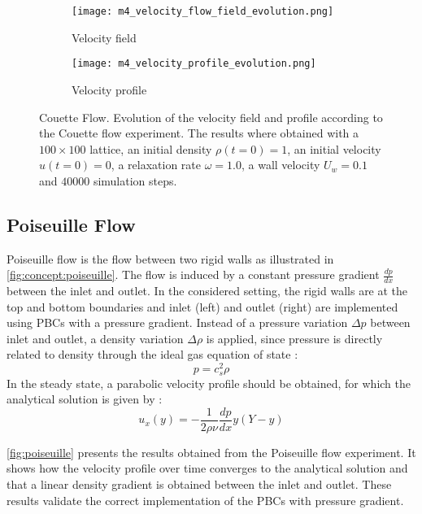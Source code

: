 \begin{figure}[ht!]
    \begin{subfigure}{\linewidth}
        \centering
        \texttt{[image: m4\_velocity\_flow\_field\_evolution.png]}
        \caption{Velocity field}
        \label{fig:couette:flow-field}
    \end{subfigure}

    \begin{subfigure}{\linewidth}
        \centering
        \texttt{[image: m4\_velocity\_profile\_evolution.png]}
        \caption{Velocity profile}
        \label{fig:couette:profile}
    \end{subfigure}
    \caption[Couette Flow]{Couette Flow. Evolution of the velocity field and profile according to the Couette flow experiment. The results where obtained with a $100\times100$ lattice, an initial density $\rho(t=0)=1$, an initial velocity $u(t=0)=0$, a relaxation rate $\omega=1.0$, a wall velocity $U_w=0.1$ and $40000$ simulation steps.}
    \label{fig:couette}
\end{figure}

\subsection{Poiseuille Flow}

Poiseuille flow is the flow between two rigid walls as illustrated in \cref{fig:concept:poiseuille}. The flow is induced by a constant pressure gradient $\frac{dp}{dx}$ between the inlet and outlet. In the considered setting, the rigid walls are at the top and bottom boundaries and inlet (left) and outlet (right) are implemented using \glspl{PBC} with a pressure gradient. Instead of a pressure variation $\Delta p$ between inlet and outlet, a density variation $\Delta \rho$ is applied, since pressure is directly related to density through the ideal gas equation of state \cite{timm2016lattice}:
\begin{equation}
    p = c_s^2 \rho
    \label{eq:pressure-density-relation}
\end{equation}
In the steady state, a parabolic velocity profile should be obtained, for which the analytical solution is given by \cite{timm2016lattice}:
\begin{equation}
    u_x(y) = - \frac{1}{2\rho\nu} \frac{dp}{dx} y (Y-y)
    \label{eq:poiseuille:analytical-solution}
\end{equation}

\cref{fig:poiseuille} presents the results obtained from the Poiseuille flow experiment. It shows how the velocity profile over time converges to the analytical solution and that a linear density gradient is obtained between the inlet and outlet. These results validate the correct implementation of the \glspl{PBC} with pressure gradient.

